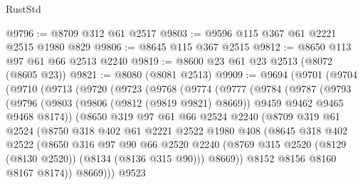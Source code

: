 \begin{lexlean}{RustStd}
\begin{coremodule}
{\begin{coremodule}
{{{{{{{{{{{{{{{{{{{{{{{{{{{{{{{{{{{{{{{{{{{{{{{{{{{{{@9796 := @8709 @312 @61 @2517
@9803 := @9596 @115 @367 @61 @2221 @2515 @1980 @829
@9806 := @8645 @115 @367 @2515
@9812 := @8650 @113 @97 @61 @66 @2513 @2240
@9819 := @8600 @23 @61 @23 @2513 (@8072 (@8605 @23))
@9821 := @8080 (@8081 @2513)
@9909 := @9694
    (@9701
      (@9704
        (@9710
          (@9713
            (@9720
              (@9723
                (@9768
                  (@9774
                    (@9777
                      (@9784
                        (@9787
                          (@9793
                            (@9796
                              (@9803
                                (@9806 (@9812 (@9819 @9821) @8669))
                                @9459
                                @9462
                                @9465
                                @9468
                                @8174))
                            (@8650
                              @319
                              @97
                              @61
                              @66
                              @2524
                              @2240
                              (@8709
                                @319
                                @61
                                @2524
                                (@8750
                                  @318
                                  @402
                                  @61
                                  @2221
                                  @2522
                                  @1980
                                  @408
                                  (@8645
                                    @318
                                    @402
                                    @2522
                                    (@8650
                                      @316
                                      @97
                                      @90
                                      @66
                                      @2520
                                      @2240
                                      (@8769
                                        @315
                                        @2520
                                        (@8129 (@8130 @2520))
                                        (@8134 (@8136 @315 @90)))
                                      @8669))
                                  @8152
                                  @8156
                                  @8160
                                  @8167
                                  @8174))
                              @8669)))
                        @9523
}}}}}}}}}}}}}}}}}}}}}}}}}}}}}}}}}}}}}}}}}}}}}}}}}}}}}
\end{coremodule}}
\end{coremodule}
\end{lexlean}
